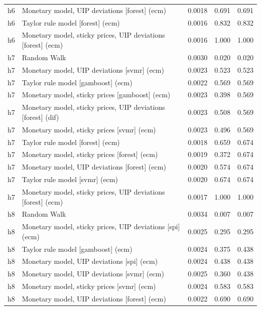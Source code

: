 \begin{ThreePartTable}
\begin{longtable}[t]{cp{5.5cm}ccc}
h6 & \raggedright Monetary model, UIP deviations [forest] (ecm) & 0.0018 & 0.691 & 0.691\\
h6 & \raggedright Taylor rule model [forest] (ecm) & 0.0016 & 0.832 & 0.832\\
h6 & \raggedright Monetary model, sticky prices, UIP deviations [forest] (ecm) & 0.0016 & 1.000 & 1.000\\
\addlinespace
h7 & \raggedright Random Walk & 0.0030 & 0.020 & 0.020\\
h7 & \raggedright Monetary model, UIP deviations [svmr] (ecm) & 0.0023 & 0.523 & 0.523\\
h7 & \raggedright Taylor rule model [gamboost] (ecm) & 0.0022 & 0.569 & 0.569\\
h7 & \raggedright Monetary model, sticky prices [gamboost] (ecm) & 0.0023 & 0.398 & 0.569\\
h7 & \raggedright Monetary model, sticky prices, UIP deviations [forest] (dif) & 0.0023 & 0.508 & 0.569\\
h7 & \raggedright Monetary model, sticky prices [svmr] (ecm) & 0.0023 & 0.496 & 0.569\\
h7 & \raggedright Taylor rule model [forest] (ecm) & 0.0018 & 0.659 & 0.674\\
h7 & \raggedright Monetary model, sticky prices [forest] (ecm) & 0.0019 & 0.372 & 0.674\\
h7 & \raggedright Monetary model, UIP deviations [forest] (ecm) & 0.0020 & 0.574 & 0.674\\
h7 & \raggedright Taylor rule model [svmr] (ecm) & 0.0020 & 0.674 & 0.674\\
h7 & \raggedright Monetary model, sticky prices, UIP deviations [forest] (ecm) & 0.0017 & 1.000 & 1.000\\
\addlinespace
h8 & \raggedright Random Walk & 0.0034 & 0.007 & 0.007\\
h8 & \raggedright Monetary model, sticky prices, UIP deviations [spi] (ecm) & 0.0025 & 0.295 & 0.295\\
h8 & \raggedright Taylor rule model [gamboost] (ecm) & 0.0024 & 0.375 & 0.438\\
h8 & \raggedright Monetary model, UIP deviations [spi] (ecm) & 0.0024 & 0.438 & 0.438\\
h8 & \raggedright Monetary model, UIP deviations [svmr] (ecm) & 0.0025 & 0.360 & 0.438\\
h8 & \raggedright Monetary model, sticky prices [svmr] (ecm) & 0.0024 & 0.583 & 0.583\\
h8 & \raggedright Monetary model, UIP deviations [forest] (ecm) & 0.0022 & 0.690 & 0.690\\

\end{longtable}
\end{ThreePartTable}
